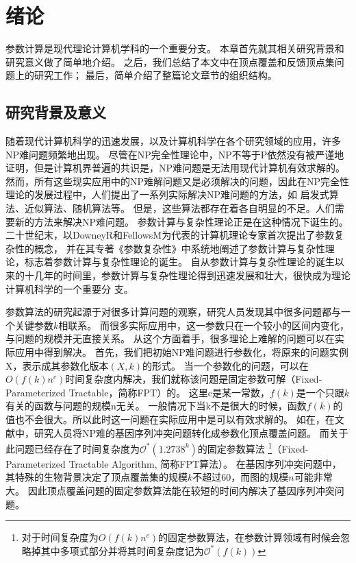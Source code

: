 ﻿\chapter{绪论}
参数计算是现代理论计算机学科的一个重要分支。
本章首先就其相关研究背景和研究意义做了简单地介绍。
之后，我们总结了本文中在顶点覆盖和反馈顶点集问题上的研究工作；
最后，简单介绍了整篇论文章节的组织结构。

\section{研究背景及意义}
随着现代计算机科学的迅速发展，以及计算机科学在各个研究领域的应用，许多NP难问题频繁地出现。
尽管在NP完全性理论中，NP不等于P依然没有被严谨地证明，但是计算机界普遍的共识是，NP难问题是无法用现代计算机有效求解的。
然而，所有这些现实应用中的NP难解问题又是必须解决的问题，因此在NP完全性理论的发展过程中，人们提出了一系列实际解决NP难问题的方法，如
启发式算法、近似算法、随机算法等。
但是，这些算法都存在着各自明显的不足。人们需要新的方法来解决NP难问题。
参数计算与复杂性理论正是在这种情况下诞生的。
二十世纪末，以DowneyR和FellowsM为代表的计算机理论专家首次提出了参数复杂性的概念，
并在其专著《参数复杂性》中系统地阐述了参数计算与复杂性理论，标志着参数计算与复杂性理论的诞生。
自从参数计算与复杂性理论的诞生以来的十几年的时间里，参数计算与复杂性理论得到迅速发展和壮大，很快成为理论计算机科学的一个重要分
支。

参数算法的研究起源于对很多计算问题的观察，研究人员发现其中很多问题都与一个关键参数$k$相联系。
而很多实际应用中，这一参数只在一个较小的区间内变化，与问题的规模并无直接关系。
从这个方面着手，很多理论上难解的问题可以在实际应用中得到解决。
首先，我们把初始NP难问题进行参数化，将原来的问题实例X，表示成其参数化版本$(X, k)$的形式。
当一个参数化的问题，可以在$O(f(k)n^c)$时间复杂度内解决，我们就称该问题是固定参数可解（Fixed-Parameterized Tractable，简称FPT）的。
这里c是某一常数，$f(k)$是一个只跟$k$有关的函数与问题的规模n无关。
一般情况下当k不是很大的时候，函数$f(k)$的值也不会很大。所以此时这一问题在实际应用中是可以有效求解的。
如在，在文献\cite{gonnet2000darwin}中，研究人员将NP难的基因序列冲突问题转化成参数化顶点覆盖问题。
而关于此问题已经存在了时间复杂度为$\mathcal{O}^*(1.2738^k)$的固定参数算法
\footnote{对于时间复杂度为$O(f(k)n^c)$的固定参数算法，在参数计算领域有时候会忽略掉其中多项式部分并将其时间复杂度记为$\mathcal{O}^*(f(k))$}（Fixed-Parameterized Tractable Algorithm, 简称FPT算法）。
在基因序列冲突问题中，其特殊的生物背景决定了顶点覆盖集的规模$k$不超过$60$，而图的规模$n$可能非常大。
因此顶点覆盖问题的固定参数算法能在较短的时间内解决了基因序列冲突问题。

